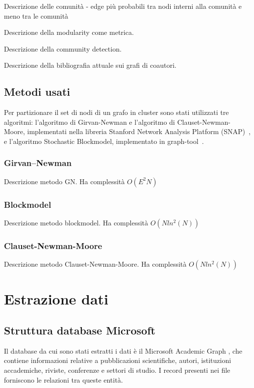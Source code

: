 \documentclass[12pt,a4paper,twoside]{report}
\begin{document}
Descrizione delle comunità - edge più probabili tra nodi interni alla comunità e meno tra le
comunità

Descrizione della modularity come metrica.

Descrizione della community detection.

Descrizione della bibliografia attuale sui grafi di coautori.

\section{Metodi usati} \label{sec:metodi}

Per partizionare il set di nodi di un grafo in cluster sono stati utilizzati tre algoritmi:
l'algoritmo di Girvan-Newman e l'algoritmo di Clauset-Newman-Moore, implementati nella libreria
Stanford Network Analysis Platform (SNAP)~\cite{snapnets}, e l'algoritmo Stochastic Blockmodel,
implementato in graph-tool~\cite{peixoto_graph-tool_2014}.

\subsection{Girvan–Newman} \label{subsec:gn}
Descrizione metodo GN.
Ha complessità $O(E^2N)$

\subsection{Blockmodel} \label{subsec:bn}
Descrizione metodo blockmodel.
Ha complessità $O(N ln^2(N))$

\subsection{Clauset-Newman-Moore} \label{subsec:cnm}
Descrizione metodo Clauset-Newman-Moore.
Ha complessità $O(N ln^2(N))$




\whitePage
\chapter{Estrazione dati} \label{cap:estrazione}

\section{Struttura database Microsoft} \label{sec:msr}
Il database da cui sono stati estratti i dati è il Microsoft Academic Graph
\cite{Sinha:2015:OMA:2740908.2742839}, che contiene informazioni relative a pubblicazioni
scientifiche, autori, istituzioni accademiche, riviste, conferenze e settori di studio. I record
presenti nei file forniscono le relazioni tra queste entità.
\end{document}
